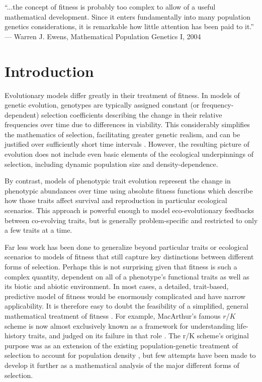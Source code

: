 \documentclass[11pt]{article}
\begin{document}
\newpage{}

``...the concept of fitness is probably too complex to allow of a useful mathematical development. Since it enters fundamentally into many population genetics considerations, it is remarkable how little attention has been paid to it.'' --- Warren J. Ewens, Mathematical Population Genetics I, 2004 

\section*{Introduction}

Evolutionary models differ greatly in their treatment of fitness. In models of genetic evolution, genotypes are typically assigned constant (or frequency-dependent) selection coefficients describing the change in their relative frequencies over time due to differences in viability. This considerably simplifies the mathematics of selection, facilitating greater genetic realism, and can be justified over sufficiently short time intervals \citep[p. 276]{ewens_2004}. However, the resulting picture of evolution does not include even basic elements of the ecological underpinnings of selection, including dynamic population size and density-dependence.

By contrast, models of phenotypic trait evolution represent the change in phenotypic abundances over time using absolute fitness functions which describe how those traits affect survival and reproduction in particular ecological scenarios. This approach is powerful enough to model eco-evolutionary feedbacks between co-evolving traits, but is generally problem-specific and restricted to only a few traits at a time.

Far less work has been done to generalize beyond particular traits or ecological scenarios to models of fitness that still capture key distinctions between different forms of selection. Perhaps this is not surprising given that fitness is such a complex quantity, dependent on all of a phenotype's functional traits \citep{violle_2007} as well as its biotic and abiotic environment. In most cases, a detailed, trait-based, predictive model of fitness would be enormously complicated and have narrow applicability. It is therefore easy to doubt the feasibility of a simplified, general mathematical treatment of fitness \citep[p. 276]{ewens_2004}. For example, MacArthur's famous $r$/$K$ scheme \citep{macarthur_1962,macarthur_1967} is now almost exclusively known as a framework for understanding life-history traits, and judged on its failure in that role \citep{pianka_1970,stearns_1977,boyce_1984,reznick_2002}. The r/K scheme's original purpose was as an extension of the existing population-genetic treatment of selection to account for population density \citep{macarthur_1962}, but few attempts have been made to develop it further as a mathematical analysis of the major different forms of selection. 
\end{document}
